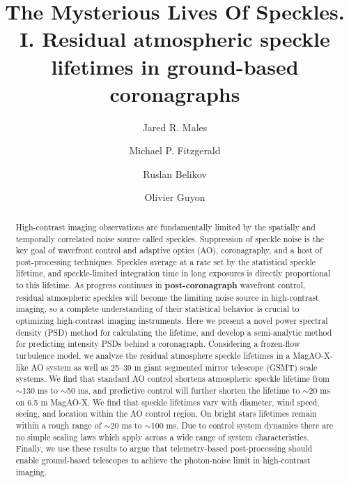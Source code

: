 \documentclass[10pt,preprint]{aastex631}
\begin{document}
\title{The Mysterious Lives Of Speckles. I. Residual atmospheric speckle lifetimes in ground-based coronagraphs}

\author{Jared R. Males}

\author[0000-0002-0176-8973]{Michael P. Fitzgerald}

\author{Ruslan Belikov}

\author{Olivier Guyon}

\begin{abstract}
High-contrast imaging observations are fundamentally limited by the spatially and temporally correlated noise source called speckles.  Suppression of speckle noise is the key goal of wavefront control and adaptive optics (AO), coronagraphy, and a host of post-processing techniques.  Speckles average at a rate set by the statistical speckle lifetime, and speckle-limited integration time in long exposures is directly proportional to this lifetime.  As progress continues in \textbf{post-coronagraph} wavefront control, residual atmospheric speckles will become the limiting noise source in high-contrast imaging, so a complete understanding of their statistical behavior is crucial to optimizing high-contrast imaging instruments. Here we present a novel power spectral density (PSD) method for calculating the lifetime, and develop a semi-analytic method for predicting intensity PSDs behind a coronagraph.  Considering a frozen-flow turbulence model, we analyze the residual atmosphere speckle lifetimes in a MagAO-X-like AO system as well as 25--39 m giant segmented mirror telescope (GSMT) scale systems.  We find that standard AO control shortens atmospheric speckle lifetime from $\sim$130 ms to $\sim$50 ms, and predictive control will further shorten the lifetime to $\sim$20 ms on 6.5 m MagAO-X. We find that speckle lifetimes vary with diameter, wind speed, seeing, and location within the AO control region.  On bright stars lifetimes remain within a rough range of $\sim$20 ms to $\sim$100 ms.  Due to control system dynamics there are no simple scaling laws which apply across a wide range of system characteristics.  Finally, we use these results to argue that telemetry-based post-processing should enable ground-based telescopes to achieve the photon-noise limit in high-contrast imaging.
\end{abstract}
\end{document}
